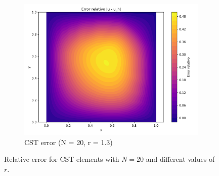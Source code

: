 \documentclass[12pt]{article}
\begin{document}
\begin{figure}[H]
    \hfill
    \begin{subfigure}[t]{0.32\textwidth}
        \centering
        \includegraphics[width=\textwidth]{Graficos/23/CST_relative_error_colormap.png}
        \caption{CST error (N = 20, r = 1.3)}
        \label{fig:cst_error_r1.3_n20}
    \end{subfigure}
    \caption{Relative error for CST elements with $N = 20$ and different values of $r$.}
    \label{fig:cst_error_comparison_n20}
\end{figure}
\end{document}

